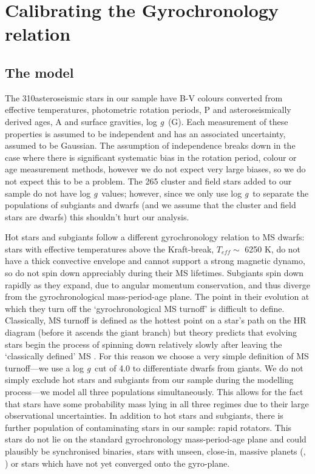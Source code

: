 \documentclass[10pt,preprint]{aastex}
\newcommand{\logg}{log \emph{g}~}
\newcommand{\nastero}{310}
\begin{document}
\section{Calibrating the Gyrochronology relation}
\label{sec:gyro_cal}

\subsection{The model}

The \nastero asteroseismic stars in our sample have B-V colours converted from effective temperatures, photometric rotation periods, P and asteroseismically derived ages, A and surface gravities, \logg (G).
Each measurement of these properties is assumed to be independent and has an associated uncertainty, assumed to be Gaussian.
The assumption of independence breaks down in the case where there is significant systematic bias in the rotation period, colour or age measurement methods, however we do not expect very large biases, so we do not expect this to be a problem.
The 265 cluster and field stars added to our sample do not have \logg values; however, since we only use \logg to separate the populations of subgiants and dwarfs (and we assume that the cluster and field stars are dwarfs) this shouldn't hurt our analysis.

Hot stars and subgiants follow a different gyrochronology relation to MS dwarfs: stars with effective temperatures above the Kraft-break, $T_{eff} \sim$ 6250 K, \citep{Kraft1967} do not have a thick convective envelope and cannot support a strong magnetic dynamo, so do not spin down appreciably during their MS lifetimes.
Subgiants spin down rapidly as they expand, due to angular momentum conservation, and thus diverge from the gyrochronological mass-period-age plane.
The point in their evolution at which they turn off the `gyrochronological MS turnoff' is difficult to define.
Classically, MS turnoff is defined as the hottest point on a star's path on the HR diagram (before it ascends the giant branch) but theory predicts that evolving stars begin the process of spinning down relatively slowly after leaving the `classically defined' MS \citep{vanSaders2013}.
For this reason we choose a very simple definition of MS turnoff---we use a \logg cut of 4.0 to differentiate dwarfs from giants.
We do not simply exclude hot stars and subgiants from our sample during the modelling process---we model all three populations simultaneously.
This allows for the fact that stars have some probability mass lying in all three regimes due to their large observational uncertainties.
In addition to hot stars and subgiants, there is further population of contaminating stars in our sample: rapid rotators.
This stars do not lie on the standard gyrochronology mass-period-age plane and could plausibly be synchronised binaries, stars with unseen, close-in, massive planets (\citet{Poppenhaeger2014}, \citet{Beky2014}) or stars which have not yet converged onto the gyro-plane.
\end{document}
